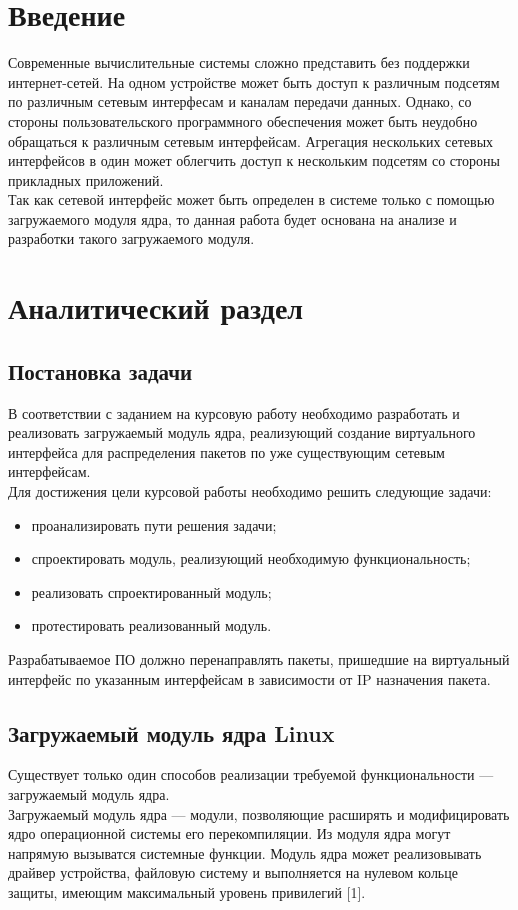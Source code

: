 \documentclass[14pt, a4paper]{extarticle}
\begin{document}
\setcounter{page}{3}

\clearpage
\tableofcontents

\clearpage
\section*{Введение}
	Современные вычислительные системы сложно представить без поддержки интернет-сетей. На одном устройстве может быть доступ к различным подсетям по различным сетевым интерфесам и каналам передачи данных. Однако, со стороны пользовательского программного обеспечения может быть неудобно обращаться к различным сетевым интерфейсам. Агрегация нескольких сетевых интерфейсов в один может облегчить доступ к нескольким подсетям со стороны прикладных приложений.\\
\indent Так как сетевой интерфейс может быть определен в системе только с помощью загружаемого модуля ядра, то данная работа будет основана на анализе и разработки такого загружаемого модуля.


\clearpage
\section{Аналитический раздел}
\subsection{Постановка задачи}
В соответствии с заданием на курсовую работу необходимо разработать
и реализовать загружаемый модуль ядра, реализующий создание виртуального интерфейса для распределения пакетов по уже существующим сетевым интерфейсам. \\
\indent Для достижения цели курсовой работы необходимо решить следующие задачи:
\begin{itemize}
	\item проанализировать пути решения задачи;
	\item спроектировать модуль, реализующий необходимую функциональность;
	\item реализовать спроектированный модуль;
	\item протестировать реализованный модуль.
\end{itemize}
\indent Разрабатываемое ПО должно перенаправлять пакеты, пришедшие на виртуальный интерфейс по указанным интерфейсам в зависимости от IP назначения пакета.



\subsection{Загружаемый модуль ядра Linux}
Существует только один способов реализации требуемой функциональности --- загружаемый модуль ядра. \\
\indent Загружаемый модуль ядра --- модули, позволяющие расширять и модифицировать ядро операционной системы его перекомпиляции. Из модуля ядра могут напрямую вызыватся системные функции. Модуль ядра может реализовывать драйвер устройства, файловую систему и выполняется на нулевом кольце защиты, имеющим максимальный уровень привилегий [1].
\end{document}
